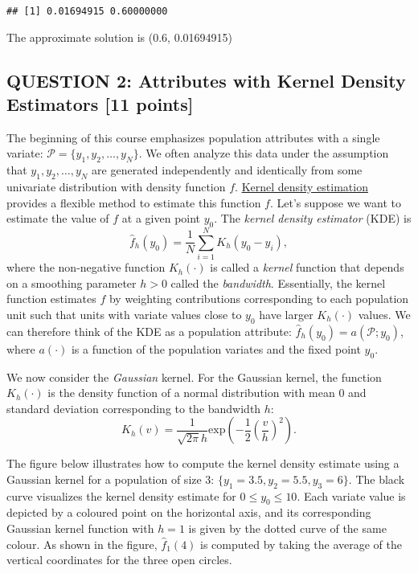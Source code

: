 \documentclass[
]{article}
\begin{document}
\begin{verbatim}
## [1] 0.01694915 0.60000000
\end{verbatim}

The approximate solution is (0.6, 0.01694915)

\newpage

\hypertarget{question-2-attributes-with-kernel-density-estimators-11-points}{%
\subsection{QUESTION 2: Attributes with Kernel Density Estimators {[}11
points{]}}\label{question-2-attributes-with-kernel-density-estimators-11-points}}

The beginning of this course emphasizes population attributes with a
single variate: \(\mathcal{P} = \{y_1, y_2, \ldots, y_N\}\). We often
analyze this data under the assumption that \(y_1, y_2, \ldots, y_N\)
are generated independently and identically from some univariate
distribution with density function \(f\).
\href{https://en.wikipedia.org/wiki/Kernel_density_estimation}{Kernel
density estimation} provides a flexible method to estimate this function
\(f\). Let's suppose we want to estimate the value of \(f\) at a given
point \(y_0\). The \emph{kernel density estimator} (KDE) is
\[\hat{f}_h(y_0) = \dfrac{1}{N}\sum_{i = 1}^NK_h(y_0 - y_i),\] where the
non-negative function \(K_h(\cdot)\) is called a \emph{kernel} function
that depends on a smoothing parameter \(h > 0\) called the
\emph{bandwidth}. Essentially, the kernel function estimates \(f\) by
weighting contributions corresponding to each population unit such that
units with variate values close to \(y_0\) have larger \(K_h(\cdot)\)
values. We can therefore think of the KDE as a population attribute:
\(\hat{f}_h(y_0) = a(\mathcal{P}; y_0)\), where \(a(\cdot)\) is a
function of the population variates and the fixed point \(y_0\).

We now consider the \emph{Gaussian} kernel. For the Gaussian kernel, the
function \(K_h(\cdot)\) is the density function of a normal distribution
with mean 0 and standard deviation corresponding to the bandwidth \(h\):
\[K_h(v) = \dfrac{1}{\sqrt{2\pi}h}\text{exp}\left(-\dfrac{1}{2}\left(\dfrac{v}{h}\right)^2\right).\]

The figure below illustrates how to compute the kernel density estimate
using a Gaussian kernel for a population of size 3:
\(\{y_1 = 3.5, y_2 = 5.5, y_3 = 6\}\). The black curve visualizes the
kernel density estimate for \(0 \le y_0 \le 10\). Each variate value is
depicted by a coloured point on the horizontal axis, and its
corresponding Gaussian kernel function with \(h = 1\) is given by the
dotted curve of the same colour. As shown in the figure,
\(\hat{f}_1(4)\) is computed by taking the average of the vertical
coordinates for the three open circles.
\end{document}
